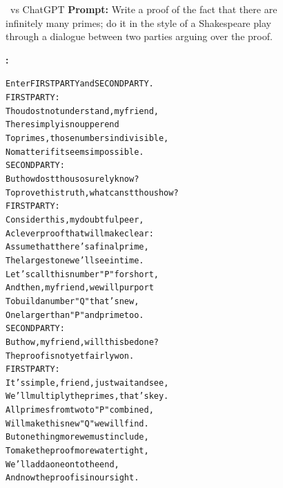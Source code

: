 \newpage
\thispagestyle{empty}
\begin{figure}[H]
\begin{AIbox}{\DV \ vs ChatGPT}
{\bf Prompt:} Write a proof of the fact that there are infinitely many primes; do it in the style of a Shakespeare play through a dialogue between two parties arguing over the proof. \\

\parbox[t]{0.4\textwidth}{{\bf \DV:} \scriptsize \begin{alltt}
Enter FIRST PARTY and SECOND PARTY. \\

FIRST PARTY:\\
Thou dost not understand, my friend,\\
There simply is no upper end\\
To primes, those numbers indivisible,\\
No matter if it seems impossible.\\

SECOND PARTY:\\
But how dost thou so surely know?\\
To prove this truth, what canst thou show?\\

FIRST PARTY:\\
Consider this, my doubtful peer,\\
A clever proof that will make clear:\\
Assume that there's a final prime,\\
The largest one we'll see in time.\\
Let's call this number "P" for short,\\
And then, my friend, we will purport\\
To build a number "Q" that's new,\\
One larger than "P" and prime too.\\

SECOND PARTY:\\
But how, my friend, will this be done?\\
The proof is not yet fairly won.\\

FIRST PARTY:\\
It's simple, friend, just wait and see,\\
We'll multiply the primes, that's key.\\
All primes from two to "P" combined,\\
Will make this new "Q" we will find.\\
But one thing more we must include,\\
To make the proof more watertight,\\
We'll add a one onto the end,\\
And now the proof is in our sight. \\


\end{alltt}}
\end{AIbox}
\end{figure}
